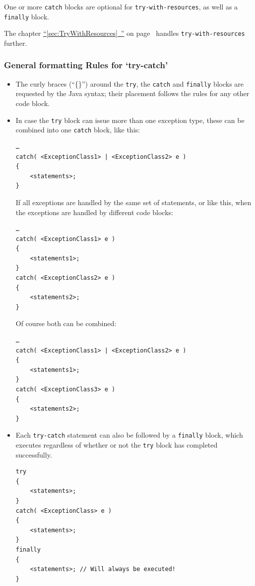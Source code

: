 \documentclass[11pt,a4paper, titlepage, parskip=half, headsepline, footsepline, cleardoublepage=current, headheight=1cm]{scrbook}
\newcommand*{\tqfullvref}[1]{\hyperref[{#1}]{“\ref*{#1}~\nameref*{#1}”} on page~\pageref{#1}}
\begin{document}
One or more \lstinline|catch| blocks are optional for \lstinline|try-with-resources|, as well as a \lstinline|finally| block.

The chapter \tqfullvref{sec:TryWithResources} handles \lstinline|try-with-resources| further.

\subsubsection{General formatting Rules for ‘try-catch’}
\begin{itemize}
\item{The curly braces (“\{\}”) around the \lstinline|try|, the \lstinline|catch| and \lstinline|finally| blocks are requested by the Java syntax; their placement follows the rules for any other code block.}

\item{In case the \lstinline|try| block can issue more than one exception type, these can be combined into one \lstinline|catch| block, like this:
\begin{lstlisting}
…
catch( <ExceptionClass1> | <ExceptionClass2> e )
{
    <statements>;
}
\end{lstlisting}

If all exceptions are handled by the same set of statements, or like this, when the exceptions are handled by different code blocks:

\begin{lstlisting}
…
catch( <ExceptionClass1> e )
{
    <statements1>;
}
catch( <ExceptionClass2> e )
{
    <statements2>;
}
\end{lstlisting}

Of course both can be combined:

\begin{lstlisting}
…
catch( <ExceptionClass1> | <ExceptionClass2> e )
{
    <statements1>;
}
catch( <ExceptionClass3> e )
{
    <statements2>;
}
\end{lstlisting}}

\item{Each \lstinline|try-catch| statement can also be followed by a \lstinline|finally| block, which  executes regardless of whether or not the \lstinline|try| block has completed successfully.

\begin{lstlisting}
try
{
    <statements>;
}
catch( <ExceptionClass> e )
{
    <statements>;
}
finally
{
    <statements>; // Will always be executed!
}
\end{lstlisting}

}
\end{itemize}
\end{document}
